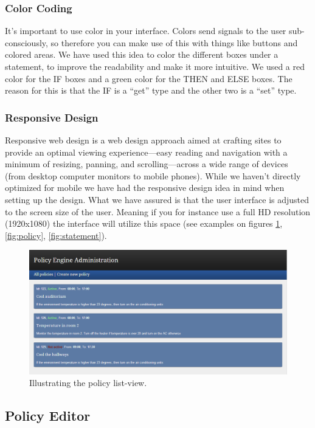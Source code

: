\subsubsection{Color Coding}
It's important to use color in your interface. Colors send signals to the user sub-consciously, so therefore you can make use of this with things like buttons and colored areas. We have used this idea to color the different boxes under a statement, to improve the readability and make it more intuitive. We used a red color for the IF boxes and a green color for the THEN and ELSE boxes. The reason for this is that the IF is a "`get"' type and the other two is a "`set"' type.

\subsubsection{Responsive Design}
Responsive web design is a web design approach aimed at crafting sites to provide an optimal viewing experience—easy reading and navigation with a minimum of resizing, panning, and scrolling—across a wide range of devices (from desktop computer monitors to mobile phones). While we haven't directly optimized for mobile we have had the responsive design idea in mind when setting up the design. What we have assured is that the user interface is adjusted to the screen size of the user. Meaning if you for instance use a full HD resolution (1920x1080) the interface will utilize this space (see examples on figures \ref{fig:policylist}, \ref{fig:policy}, \ref{fig:statement}).

\begin{figure}[ht]
\centering
\includegraphics[width=\columnwidth]{policylist.png}
\caption{Illustrating the policy list-view.}
\label{fig:policylist}
\end{figure}

\subsection{Policy Editor}


